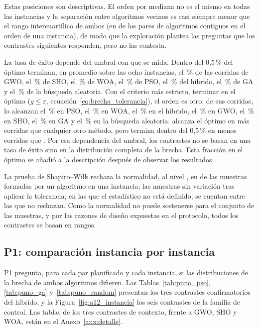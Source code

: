 Estas posiciones son descriptivas. El orden por mediana no es el mismo en todas las instancias y la separación entre algoritmos vecinos es casi siempre menor que el rango intercuartílico de ambos (en \NeighborPairsWithinIqr{} de los \NeighborPairs{} pares de algoritmos contiguos en el orden de una instancia), de modo que la exploración plantea las preguntas que los contrastes siguientes responden, pero no las contesta.

La tasa de éxito depende del umbral con que se mida. Dentro del 0,5\,\% del óptimo terminan, en promedio sobre las ocho instancias, el \SuccessHalfPctGwo\,\% de las corridas de GWO, el \SuccessHalfPctSho\,\% de SHO, el \SuccessHalfPctWoa\,\% de WOA, el \SuccessHalfPctPso\,\% de PSO, el \SuccessHalfPctPsoGa\,\% del híbrido, el \SuccessHalfPctGa\,\% de GA y el \SuccessHalfPctRandom\,\% de la búsqueda aleatoria. Con el criterio más estricto, terminar en el óptimo ($g\leq\varepsilon$, ecuación~\eqref{eq:brecha_tolerancia}), el orden es otro: de sus \InOptRunsPerAlgorithm{} corridas, lo alcanzan el \InOptPctPso\,\% en PSO, el \InOptPctWoa\,\% en WOA, el \InOptPctPsoGa\,\% en el híbrido, el \InOptPctGwo\,\% en GWO, el \InOptPctSho\,\% en SHO, el \InOptPctGa\,\% en GA y el \InOptPctRandom\,\% en la búsqueda aleatoria. \InOptBestAlgorithm{} alcanza el óptimo en más corridas que cualquier otro método, pero termina dentro del 0,5\,\% en menos corridas que \InOptBestBehindAtHalf. Por esa dependencia del umbral, los contrastes no se basan en una tasa de éxito sino en la distribución completa de la brecha. Esta fracción en el óptimo se añadió a la descripción después de observar los resultados.

La prueba de Shapiro--Wilk rechaza la normalidad, al nivel \StatAlpha, en \ShapiroRejects{} de las \ShapiroTotal{} muestras formadas por un algoritmo en una instancia; las muestras sin variación tras aplicar la tolerancia, en las que el estadístico no está definido, se cuentan entre las que no rechazan. Como la normalidad no puede sostenerse para el conjunto de las muestras, y por las razones de diseño expuestas en el protocolo, todos los contrastes se basan en rangos.

\subsection{P1: comparación instancia por instancia}

P1 pregunta, para cada par planificado y cada instancia, si las distribuciones de la brecha de ambos algoritmos difieren. Las Tablas~\ref{tab:puno_pso}, \ref{tab:puno_ga} y~\ref{tab:puno_random} presentan los tres contrastes confirmatorios del híbrido, y la Figura~\ref{fig:a12_instancia} los seis contrastes de la familia de control. Las tablas de los tres contrastes de contexto, frente a GWO, SHO y WOA, están en el Anexo~\ref{anx:detalle}.

